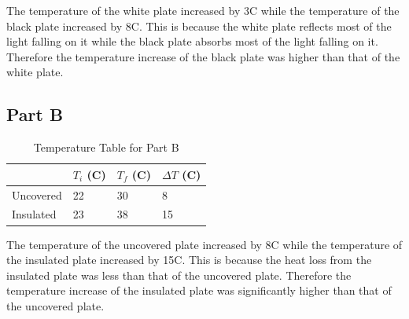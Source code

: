 \documentclass[a4paper, 12pt, english]{article}
\begin{document}
The temperature of the white plate increased by 3\degree C while the
temperature of the black plate increased by 8\degree C. This is because the
white plate reflects most of the light falling on it while the black plate
absorbs most of the light falling on it. Therefore the temperature increase of
the black plate was higher than that of the white plate.
\subsection{Part B}
\begin{table}[H]
	\centering
	\caption{Temperature Table for Part B}
	\label{tab:table2}
	\begin{tabular}{@{}llll@{}}
		\toprule
		          & \textbf{$T_i$ (\degree C)} & \textbf{$T_f$ (\degree C)} & \textbf{$\Delta T$ (\degree C)} \\ \midrule
		Uncovered & 22                         & 30                         & 8                               \\
		Insulated & 23                         & 38                         & 15                              \\ \bottomrule
	\end{tabular}
\end{table}

The temperature of the uncovered plate increased by 8\degree C while the
temperature of the insulated plate increased by 15\degree C. This
is because the heat loss from the insulated plate was less than that of the
uncovered plate. Therefore the temperature increase of the insulated plate was
significantly higher than that of the uncovered plate.
\end{document}
